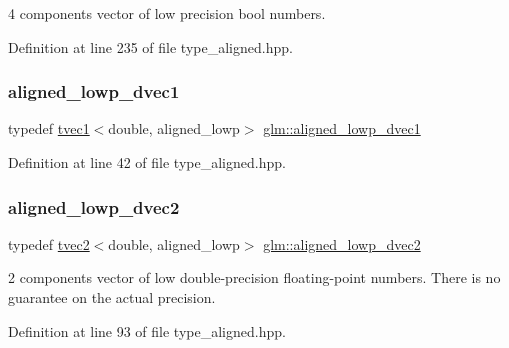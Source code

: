 4 components vector of low precision bool numbers. 



Definition at line 235 of file type\+\_\+aligned.\+hpp.

\mbox{\label{group__gtc__type__aligned_gace9ca6ecc2dc6fe5891bb6d15bf3b317}} 
\subsubsection{\texorpdfstring{aligned\_lowp\_dvec1}{aligned\_lowp\_dvec1}}
{\footnotesize\ttfamily typedef \mbox{\hyperlink{structglm_1_1tvec1}{tvec1}}$<$double, aligned\+\_\+lowp$>$ \mbox{\hyperlink{group__gtc__type__aligned_gace9ca6ecc2dc6fe5891bb6d15bf3b317}{glm\+::aligned\+\_\+lowp\+\_\+dvec1}}}



Definition at line 42 of file type\+\_\+aligned.\+hpp.

\mbox{\label{group__gtc__type__aligned_ga34c204b5e816428a4ad5b0489fe8aa48}} 
\subsubsection{\texorpdfstring{aligned\_lowp\_dvec2}{aligned\_lowp\_dvec2}}
{\footnotesize\ttfamily typedef \mbox{\hyperlink{structglm_1_1tvec2}{tvec2}}$<$double, aligned\+\_\+lowp$>$ \mbox{\hyperlink{group__gtc__type__aligned_ga34c204b5e816428a4ad5b0489fe8aa48}{glm\+::aligned\+\_\+lowp\+\_\+dvec2}}}

2 components vector of low double-\/precision floating-\/point numbers. There is no guarantee on the actual precision. 

Definition at line 93 of file type\+\_\+aligned.\+hpp.

\mbox{\label{group__gtc__type__aligned_ga858a0e5240ebf37327c00aa040e5ed42}} 
